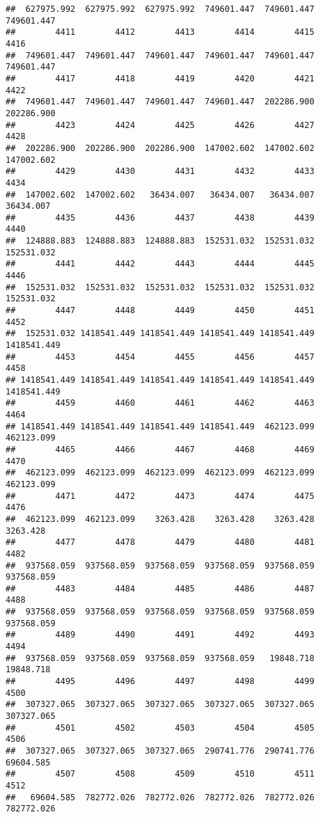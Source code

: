 \documentclass[
]{book}
\begin{document}
\begin{verbatim}
##  627975.992  627975.992  627975.992  749601.447  749601.447  749601.447 
##        4411        4412        4413        4414        4415        4416 
##  749601.447  749601.447  749601.447  749601.447  749601.447  749601.447 
##        4417        4418        4419        4420        4421        4422 
##  749601.447  749601.447  749601.447  749601.447  202286.900  202286.900 
##        4423        4424        4425        4426        4427        4428 
##  202286.900  202286.900  202286.900  147002.602  147002.602  147002.602 
##        4429        4430        4431        4432        4433        4434 
##  147002.602  147002.602   36434.007   36434.007   36434.007   36434.007 
##        4435        4436        4437        4438        4439        4440 
##  124888.883  124888.883  124888.883  152531.032  152531.032  152531.032 
##        4441        4442        4443        4444        4445        4446 
##  152531.032  152531.032  152531.032  152531.032  152531.032  152531.032 
##        4447        4448        4449        4450        4451        4452 
##  152531.032 1418541.449 1418541.449 1418541.449 1418541.449 1418541.449 
##        4453        4454        4455        4456        4457        4458 
## 1418541.449 1418541.449 1418541.449 1418541.449 1418541.449 1418541.449 
##        4459        4460        4461        4462        4463        4464 
## 1418541.449 1418541.449 1418541.449 1418541.449  462123.099  462123.099 
##        4465        4466        4467        4468        4469        4470 
##  462123.099  462123.099  462123.099  462123.099  462123.099  462123.099 
##        4471        4472        4473        4474        4475        4476 
##  462123.099  462123.099    3263.428    3263.428    3263.428    3263.428 
##        4477        4478        4479        4480        4481        4482 
##  937568.059  937568.059  937568.059  937568.059  937568.059  937568.059 
##        4483        4484        4485        4486        4487        4488 
##  937568.059  937568.059  937568.059  937568.059  937568.059  937568.059 
##        4489        4490        4491        4492        4493        4494 
##  937568.059  937568.059  937568.059  937568.059   19848.718   19848.718 
##        4495        4496        4497        4498        4499        4500 
##  307327.065  307327.065  307327.065  307327.065  307327.065  307327.065 
##        4501        4502        4503        4504        4505        4506 
##  307327.065  307327.065  307327.065  290741.776  290741.776   69604.585 
##        4507        4508        4509        4510        4511        4512 
##   69604.585  782772.026  782772.026  782772.026  782772.026  782772.026 

\end{verbatim}
\end{document}

